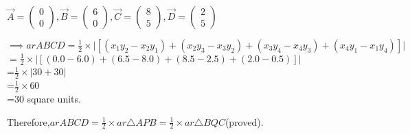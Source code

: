 \documentclass[12pt]{article}
\begin{document}
   $\Vec{A}=\begin{pmatrix}
       0\\0
   \end{pmatrix},
 \Vec{B}=\begin{pmatrix}
       6\\0
   \end{pmatrix},
   \Vec{C}=\begin{pmatrix}
       8\\5
   \end{pmatrix},
   \Vec{D}=\begin{pmatrix}
       2\\5
   \end{pmatrix}$
   
$\implies ar ABCD = \frac{1}{2}\times \big |[(x_1y_2-x_2y_1)+(x_2y_3-x_3y_2)+(x_3y_4-x_4y_3)+(x_4y_1-x_1y_4)] \big|$\\
$ = \frac{1}{2} \times \big |[(0.0-6.0)+(6.5-8.0)+(8.5-2.5)+(2.0-0.5)] \big|$\\
 =$ \frac{1}{2} \times\big |30+30\big|$\\
 =$\frac{1}{2} \times60$\\
 =30 square units.

 Therefore,$ar ABCD = \frac{1}{2}\times ar \triangle APB = \frac{1}{2}\times ar \triangle BQC$(proved).
\end{document}
